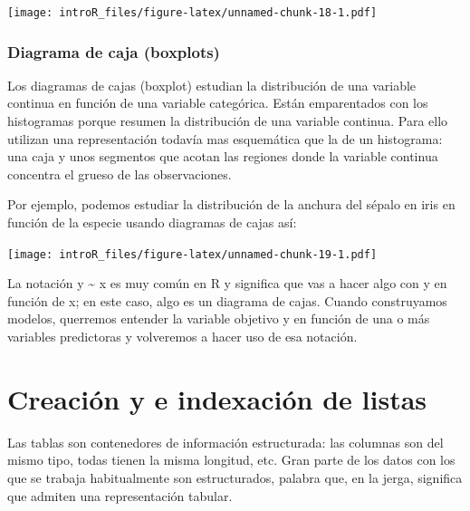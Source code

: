\documentclass[
]{book}
\newenvironment{Shaded}{\begin{snugshade}}{\end{snugshade}}
\newcommand{\CharTok}[1]{\textcolor[rgb]{0.31,0.60,0.02}{#1}}
\newcommand{\DataTypeTok}[1]{\textcolor[rgb]{0.13,0.29,0.53}{#1}}
\newcommand{\KeywordTok}[1]{\textcolor[rgb]{0.13,0.29,0.53}{\textbf{#1}}}
\newcommand{\NormalTok}[1]{#1}
\newcommand{\OperatorTok}[1]{\textcolor[rgb]{0.81,0.36,0.00}{\textbf{#1}}}
\newcommand{\StringTok}[1]{\textcolor[rgb]{0.31,0.60,0.02}{#1}}
\begin{document}
\texttt{[image: introR\_files/figure-latex/unnamed-chunk-18-1.pdf]}

\hypertarget{diagrama-de-caja-boxplots}{%
\subsection{Diagrama de caja (boxplots)}\label{diagrama-de-caja-boxplots}}

Los diagramas de cajas (boxplot) estudian la distribución de una variable continua en función de una variable categórica. Están emparentados con los histogramas porque resumen la distribución de una variable continua. Para ello utilizan una representación todavía mas esquemática que la de un histograma: una caja y unos segmentos que acotan las regiones donde la variable continua concentra el grueso de las observaciones.

Por ejemplo, podemos estudiar la distribución de la anchura del sépalo en iris en función de la especie usando diagramas de cajas así:

\begin{Shaded}
\end{Shaded}

\texttt{[image: introR\_files/figure-latex/unnamed-chunk-19-1.pdf]}

La notación y \textasciitilde{} x es muy común en R y significa que vas a hacer algo con y en función de x; en este caso, algo es un diagrama de cajas. Cuando construyamos modelos, querremos entender la variable objetivo y en función de una o más variables predictoras y volveremos a hacer uso de esa notación.

\hypertarget{creaciuxf3n-y-e-indexaciuxf3n-de-listas}{%
\chapter{Creación y e indexación de listas}\label{creaciuxf3n-y-e-indexaciuxf3n-de-listas}}

Las tablas son contenedores de información estructurada: las columnas son del mismo tipo, todas tienen la misma longitud, etc. Gran parte de los datos con los que se trabaja habitualmente son estructurados, palabra que, en la jerga, significa que admiten una representación tabular.
\end{document}
